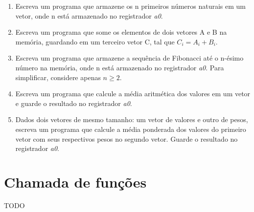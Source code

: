 \documentclass{article}
\begin{document}
\begin{enumerate}
	\item Escreva um programa que armazene os n primeiros números naturais em um
	vetor, onde n está armazenado no registrador \textit{a0}.

	\item Escreva um programa que some os elementos de dois vetores A e B na
	memória, guardando em um terceiro vetor C, tal que $C_i = A_i + B_i$.

	\item Escreva um programa que armazene a sequência de Fibonacci até o n-ésimo
	número na memória, onde n está armazenado no registrador \textit{a0}. Para
	simplificar, considere apenas $n \geq 2$.

	\item Escreva um programa que calcule a média aritmética dos valores em um
	vetor e guarde o resultado no registrador \textit{a0}.

	\item Dados dois vetores de mesmo tamanho: um vetor de valores e outro de
	pesos, escreva um programa que calcule a média ponderada dos valores do
	primeiro vetor com seus respectivos pesos no segundo vetor. Guarde o resultado
	no registrador \textit{a0}.
\end{enumerate}

\section{Chamada de funções}

TODO
\end{document}
